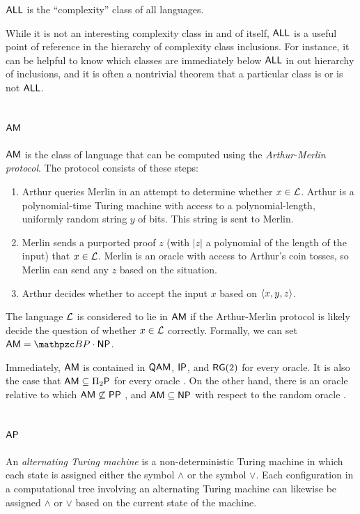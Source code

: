 $\mathsf{ALL}$ is the ``complexity'' class of all languages.

While it is not an interesting complexity class in and of itself, $\mathsf{ALL}$ is
a useful point of reference in the hierarchy of complexity class inclusions. For
instance, it can be helpful to know which classes are immediately below
$\mathsf{ALL}$ in out hierarchy of inclusions, and it is often a nontrivial theorem
that a particular class is or is not $\mathsf{ALL}$.

\subsection{$\mathsf{AM}$}

$\mathsf{AM}$ is the class of language that can be computed using the
\textit{Arthur-Merlin protocol}. The protocol consists of these steps:
\begin{enumerate}
\item Arthur queries Merlin in an attempt to determine whether $x\in\mathcal{L}$. Arthur
  is a polynomial-time Turing machine with access to a polynomial-length,
  uniformly random string $y$ of bits. This string is sent to Merlin.
\item Merlin sends a purported proof $z$ (with $|z|$ a polynomial of the length of
  the input) that $x\in\mathcal{L}$. Merlin is an oracle with access to Arthur's coin 
  tosses, so Merlin can send any $z$ based on the situation.
\item Arthur decides whether to accept the input $x$ based on $\left\langle x,y,z\right\rangle$.
\end{enumerate}
The language $\mathcal{L}$ is considered to lie in $\mathsf{AM}$ if the Arthur-Merlin
protocol is likely decide the question of whether $x\in\mathcal{L}$ correctly. Formally,
we can set $\msf{AM}=\cBP\cdot\msf{NP}$.

Immediately, $\mathsf{AM}$ is contained in $\mathsf{QAM}$, $\mathsf{IP}$, and 
$\mathsf{RG}(2)$ for every oracle. It is also the case that 
$\mathsf{AM}\subseteq\Pi_2\mathsf{P}$ for every oracle \cite{babai1985trading}. On the 
other hand, there is an oracle relative to which $\mathsf{AM}\not\subseteq\mathsf{PP}$
\cite{vereschchagin1992power}, and $\mathsf{AM}\subseteq\mathsf{NP}$ with respect to 
the random oracle \cite{babai1988arthur}.

\subsection{$\mathsf{AP}$}

An \textit{alternating Turing machine} is a non-deterministic Turing machine in
which each state is assigned either the symbol $\wedge$ or the symbol
$\vee$. Each configuration in a computational tree involving an alternating
Turing machine can likewise be assigned $\wedge$ or $\vee$ based on the current
state of the machine.

